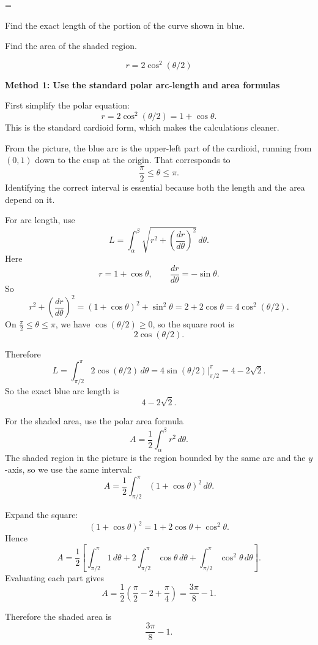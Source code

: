 \documentclass[a4paper,12pt,twocolumn]{article}
\newlength{\problemnumberwidth}
\newenvironment{solutionbox}{\begin{framed}}{\end{framed}}
\newcommand{\problem}[3]{%
  \Needspace{10\baselineskip}%
  \phantomsection\label{#1}%
  \par\vspace{0.8em}%
  \noindent
  \hangindent=\problemnumberwidth
  \hangafter=1
  \makebox[\problemnumberwidth][l]{\textbf{#2.}}#3\par
}
\begin{document}
\problem{prob:10-review-44}{44}{%
\begin{subparts}
\item Find the exact length of the portion of the curve shown in blue.
\item Find the area of the shaded region.
\end{subparts}
\[
r=2\cos^2(\theta/2)
\]}

\begin{solutionbox}
\textbf{Method 1: Use the standard polar arc-length and area formulas}

\begin{steps}
\item First simplify the polar equation:
\[
r=2\cos^2(\theta/2)=1+\cos\theta.
\]
This is the standard cardioid form, which makes the calculations cleaner.

\item From the picture, the blue arc is the upper-left part of the cardioid, running from \((0,1)\) down to the cusp at the origin. That corresponds to
\[
\frac{\pi}{2}\le \theta\le \pi.
\]
Identifying the correct interval is essential because both the length and the area depend on it.

\item For arc length, use
\[
L=\int_{\alpha}^{\beta}\sqrt{r^2+\left(\frac{dr}{d\theta}\right)^2}\,d\theta.
\]
Here
\[
r=1+\cos\theta,
\qquad
\frac{dr}{d\theta}=-\sin\theta.
\]
So
\[
r^2+\left(\frac{dr}{d\theta}\right)^2
=(1+\cos\theta)^2+\sin^2\theta
=2+2\cos\theta
=4\cos^2(\theta/2).
\]
On \(\frac{\pi}{2}\le\theta\le\pi\), we have \(\cos(\theta/2)\ge0\), so the square root is
\[
2\cos(\theta/2).
\]

\item Therefore
\[
L=\int_{\pi/2}^{\pi}2\cos(\theta/2)\,d\theta
=4\sin(\theta/2)\Big|_{\pi/2}^{\pi}
=4-2\sqrt2.
\]
So the exact blue arc length is
\[
\boxed{4-2\sqrt2.}
\]

\item For the shaded area, use the polar area formula
\[
A=\frac12\int_{\alpha}^{\beta}r^2\,d\theta.
\]
The shaded region in the picture is the region bounded by the same arc and the \(y\)-axis, so we use the same interval:
\[
A=\frac12\int_{\pi/2}^{\pi}(1+\cos\theta)^2\,d\theta.
\]

\item Expand the square:
\[
(1+\cos\theta)^2=1+2\cos\theta+\cos^2\theta.
\]
Hence
\[
A=\frac12\left[\int_{\pi/2}^{\pi}1\,d\theta
 + 2\int_{\pi/2}^{\pi}\cos\theta\,d\theta
 + \int_{\pi/2}^{\pi}\cos^2\theta\,d\theta\right].
\]
Evaluating each part gives
\[
A=\frac12\left(\frac{\pi}{2}-2+\frac{\pi}{4}\right)
=\frac{3\pi}{8}-1.
\]

\item Therefore the shaded area is
\[
\boxed{\frac{3\pi}{8}-1.}
\]
\end{steps}
\end{solutionbox}
\end{document}
